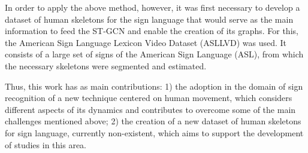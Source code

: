 

In order to apply the above method, however, it was first necessary to develop a dataset of human skeletons for the sign language that would serve as the main information to feed the ST-GCN and enable the creation of its graphs. For this, the American Sign Language Lexicon Video Dataset (ASLLVD) was used. It consists of a large set of signs of the American Sign Language (ASL), from which the necessary skeletons were segmented and estimated.


Thus, this work has as main contributions: 1) the adoption in the domain of sign recognition of a new technique centered on human movement, which considers different aspects of its dynamics and contributes to overcome some of the main challenges mentioned above; 2) the creation of a new dataset of human skeletons for sign language, currently non-existent, which aims to support the development of studies in this area.


